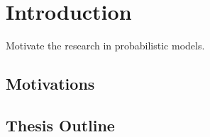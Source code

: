 \chapter{Introduction}
\label{chapter1}
Motivate the research in probabilistic models.

\section{Motivations}
\label{section1.1}


\section{Thesis Outline}
\label{section1.3}

